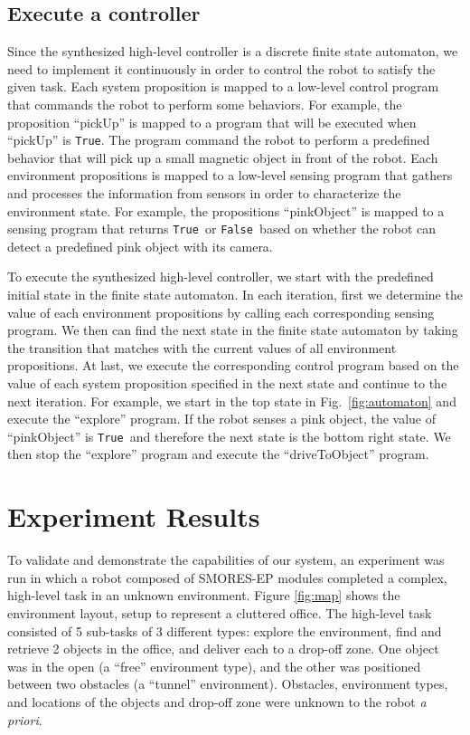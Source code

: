 \documentclass[conference]{IEEEtran}
\newcommand{\lt}{{\tt True }}
\newcommand{\lf}{{\tt False }}
\newcommand{\ltnsp}{{\tt True}}
\begin{document}
\subsection{Execute a controller}
Since the synthesized high-level controller is a discrete finite state automaton, we need to implement it continuously in order to control the robot to satisfy the given task. 
Each system proposition is mapped to a low-level control program that commands the robot to perform some behaviors.
For example, the proposition ``pickUp'' is mapped to a program that will be executed when ``pickUp'' is \ltnsp. The program command the robot to perform a predefined behavior that will pick up a small magnetic object in front of the robot.
Each environment propositions is mapped to a low-level sensing program that gathers and processes the information from sensors in order to characterize the environment state.
For example, the propositions ``pinkObject'' is mapped to a sensing program that returns \lt or \lf based on whether the robot can detect a predefined pink object with its camera.

To execute the synthesized high-level controller, we start with the predefined initial state in the finite state automaton.
In each iteration, first we determine the value of each environment propositions by calling each corresponding sensing program.
We then can find the next state in the finite state automaton by taking the transition that matches with the current values of all environment propositions.
At last, we execute the corresponding control program based on the value of each system proposition specified in the next state and continue to the next iteration.
For example, we start in the top state in Fig.~\ref{fig:automaton} and execute the ``explore'' program.
If the robot senses a pink object, the value of ``pinkObject'' is \lt and therefore the next state is the bottom right state. We then stop the ``explore'' program and execute the ``driveToObject'' program.

\section{Experiment Results}
\label{sec:experiments}
%
To validate and demonstrate the capabilities of our system, an experiment was run in which a robot composed of SMORES-EP modules completed a complex, high-level task in an unknown environment. Figure \ref{fig:map} shows the environment layout, setup to represent a cluttered office. The high-level task consisted of 5 sub-tasks of 3 different types: explore the environment, find and retrieve 2 objects in the office, and deliver each to a drop-off zone. One object was in the open (a ``free'' environment type), and the other was positioned between two obstacles (a ``tunnel'' environment). Obstacles, environment types, and locations of the objects and drop-off zone were unknown to the robot \textit{a priori}.
\end{document}
